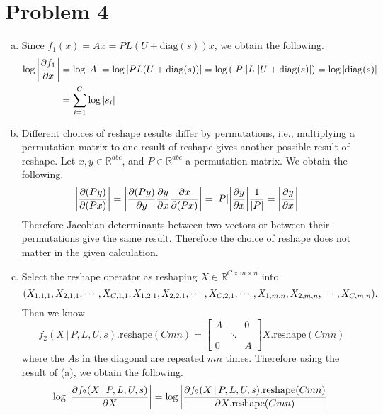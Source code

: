 \documentclass[10pt]{article}
\begin{document}
\section*{Problem 4}
\begin{enumerate}[(a)]
    \item Since $f_1(x) = Ax = PL(U+\mathrm{diag}(s))x$, we obtain the following.
    \begin{align*}
        \log\qty|\frac{\partial f_1}{\partial x}| 
        &= \log\qty|A| = \log\qty|PL\qty(U+\mathrm{diag}(s))| = \log\qty(|P||L||U+\mathrm{diag}(s)|) = \log|\mathrm{diag}(s)| \\
        &= \sum_{i=1}^{C}\log\qty|s_i|
    \end{align*}
    \item Different choices of reshape results differ by permutations,
    i.e., multiplying a permutation matrix to one result of reshape gives another possible result of reshape.
    Let $x, y \in \mathbb{R}^{abc}$, and $P \in \mathbb{R}^{abc}$ a permutation matrix.
    We obtain the following.
    \begin{align*}
        \qty|\frac{\partial (Py)}{\partial (Px)}| &= \qty|\frac{\partial (Py)}{\partial y}\frac{\partial y}{\partial x}\frac{\partial x}{\partial (Px)}| = |P|\qty|\frac{\partial y}{\partial x}|\frac{1}{|P|} = \qty|\frac{\partial y}{\partial x}|
    \end{align*}
    Therefore Jacobian determinants between two vectors or between their permutations give the same result.
    Therefore the choice of reshape does not matter in the given calculation.
    \item Select the reshape operator as reshaping $X \in \mathbb{R}^{C \times m \times n}$ into 
    $$\qty(X_{1, 1, 1}, X_{2, 1, 1}, \cdots, X_{C, 1, 1}, X_{1, 2, 1}, X_{2, 2, 1}, \cdots, X_{C, 2, 1}, \cdots, X_{1, m, n}, X_{2, m, n}, \cdots, X_{C, m, n}).$$
    Then we know
    $$f_2(X \,|\, P, L, U, s).\mathrm{reshape}(Cmn) = \begin{bmatrix}
        A &        & 0 \\
          & \ddots &   \\
        0 &        & A
    \end{bmatrix}X.\mathrm{reshape}(Cmn)$$
    where the $A$s in the diagonal are repeated $mn$ times. Therefore using the result of (a), we obtain the following.
    \begin{align*}
        \log\qty|\frac{\partial f_2(X \,|\, P, L, U, s)}{\partial X}| &= \log\qty|\frac{\partial f_2(X \,|\, P, L, U, s).\mathrm{reshape}(Cmn)}{\partial X.\mathrm{reshape}(Cmn)}| \\

\end{align*}
\end{enumerate}
\end{document}
